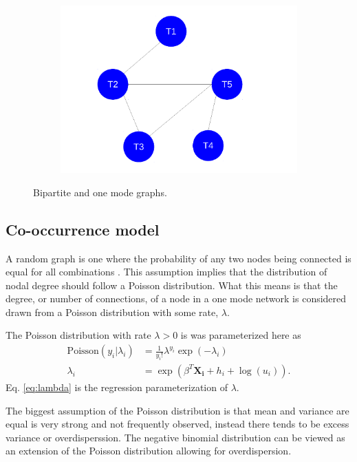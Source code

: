 \documentclass[12pt,letterpaper]{article}
\begin{document}
\begin{figure}[ht]
  \begin{subfigure}[b]{0.4\textwidth}
    \caption{}
    \includegraphics[height = 0.5\textheight, width = \textwidth, keepaspectratio = true]{figure/one_mode}
    \label{subfig:one_mode}
  \end{subfigure}
  \caption{Bipartite and one mode graphs.}
  \label{fig:graphs}
\end{figure}


\subsection{Co-occurrence model}
A random graph is one where the probability of any two nodes being connected is equal for all combinations \citep{Erdos1959}. This assumption implies that the distribution of nodal degree should follow a Poisson distribution. What this means is that the degree, or number of connections, of a node in a one mode network is considered drawn from a Poisson distribution with some rate, \(\lambda\).

The Poisson distribution with rate \(\lambda > 0\) is was parameterized here as 
\begin{align}
  \mathrm{Poisson}(y_{i} | \lambda_{i}) &= \frac{1}{y_{i}!} \lambda^{y_{i}} \exp(-\lambda_{i}) 
  \label{eq:pois} \\
  \lambda_{i} &= \exp(\beta^{T}\mathbf{X_{i}} + h_{i} + \log(u_{i})).
  \label{eq:lambda}
\end{align}
Eq. \ref{eq:lambda} is the regression parameterization of \(\lambda\).

The biggest assumption of the Poisson distribution is that mean and variance are equal is very strong and not frequently observed, instead there tends to be excess variance or overdisperssion. The negative binomial distribution can be viewed as an extension of the Poisson distribution allowing for overdispersion. 
\end{document}
